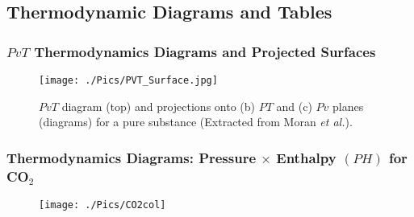 \documentclass[10pt,compress,handout,unknownkeysallowed]{beamer}
\begin{document}
\begin{comment}
\begin{frame}
 \frametitle{PVT Behaviour of Pure Substances}
 \begin{columns}
  \begin{column}[l]{0.5\linewidth}
\begin{itemize}
\item <1-> Similarly, for the {\bf triple point} -- $\textcolor{blue}{\mathcal{P}=3}$, all three phases are in equilibrium
\begin{displaymath}
\Psi = 2 + \textcolor{red}{1} - \textcolor{blue}{3} = 0
\end{displaymath}
\item <2-> Here there is {\bf no degrees of freedom} -- i.e., there is {\bf just} one value for pressure and temperature that make the {\bf three phases to coexist}.
\item <3-> Any change in either intensive properties will drive the system away from the {\it triple point}.
\end{itemize}
  \end{column}
  \begin{column}[l]{0.5\linewidth}
   \begin{figure}%
    \begin{center}
     \texttt{[image: ./Pics/PVT\_Surface.jpg]}
    \end{center}
\caption{$PVT$ surface (top) and projections onto (b) $PT$ and (c) $PV$ diagrams for a pure substance (Extracted from Moran {\it et al.})}
   \end{figure}    
  \end{column}
 \end{columns}
\end{frame}


\end{comment}
\subsection{Thermodynamic Diagrams and Tables}

\begin{frame}
 \frametitle{$PvT$ Thermodynamics Diagrams and Projected Surfaces}
  \begin{center}
   \begin{figure}
     \texttt{[image: ./Pics/PVT\_Surface.jpg]}
\caption{$PvT$ diagram (top) and projections onto (b) $PT$ and (c) $Pv$ planes (diagrams) for a pure substance (Extracted from Moran {\it et al.}).}
   \end{figure}
   \end{center}
\end{frame}
\begin{frame}
 \frametitle{Thermodynamics Diagrams: Pressure $\times$ Enthalpy $(PH)$ for CO$_{2}$}
  \begin{center}
   \begin{figure}
     \texttt{[image: ./Pics/CO2col]}
   \end{figure}
   \end{center}
\end{frame}
\end{document}
